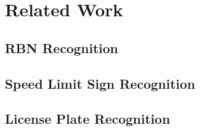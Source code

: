 \chapter{Related Work}
\label{ch:related_work}


\section{RBN Recognition}

\cite{Fu:2015by}


\section{Speed Limit Sign Recognition}


\section{License Plate Recognition}

